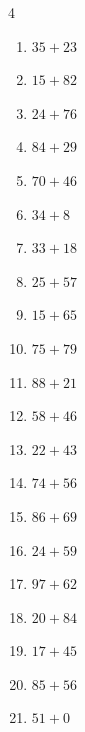 \begin{multicols}{4}
\begin{enumerate}
  \item $35+23$
        \phantom{$=58$}

  \item $15+82$
        \phantom{$=97$}

  \item $24+76$
        \phantom{$=100$}

  \item $84+29$
        \phantom{$=113$}

  \item $70+46$
        \phantom{$=116$}

  \item $34+8$
        \phantom{$=42$}

  \item $33+18$
        \phantom{$=51$}

  \item $25+57$
        \phantom{$=82$}

  \item $15+65$
        \phantom{$=80$}

  \item $75+79$
        \phantom{$=154$}

\columnbreak %

  \item $88+21$
        \phantom{$=109$}

  \item $58+46$
        \phantom{$=104$}

  \item $22+43$
        \phantom{$=65$}

  \item $74+56$
        \phantom{$=130$}

  \item $86+69$
        \phantom{$=155$}

  \item $24+59$
        \phantom{$=83$}

  \item $97+62$
        \phantom{$=159$}

  \item $20+84$
        \phantom{$=104$}

  \item $17+45$
        \phantom{$=62$}

  \item $85+56$
        \phantom{$=141$}

  \item $51+0$
        \phantom{$=51$}


\end{enumerate}
\end{multicols}
